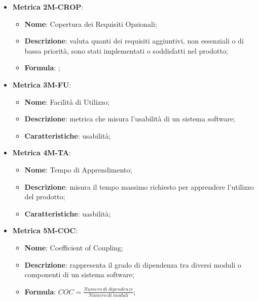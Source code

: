 \begin{itemize}
    \item \textbf{Metrica 2M-CROP}:
    \begin{itemize}
        \item \textbf{Nome}: Copertura dei Requisiti Opzionali;
        \item \textbf{Descrizione}: valuta quanti dei requisiti aggiuntivi, non essenziali o di bassa priorità, sono stati implementati o soddisfatti nel prodotto;
        \item \textbf{Formula}: ;
    \end{itemize}
\end{itemize}

\begin{itemize}
    \item \textbf{Metrica 3M-FU}:
    \begin{itemize}
        \item \textbf{Nome}: Facilità di Utilizzo;
        \item \textbf{Descrizione}: metrica che misura l'usabilità di un sistema software;
        \item \textbf{Caratteristiche}: usabilità;
    \end{itemize}
\end{itemize}

\begin{itemize}
    \item \textbf{Metrica 4M-TA}:
    \begin{itemize}
        \item \textbf{Nome}: Tempo di Apprendimento;
        \item \textbf{Descrizione}: misura il tempo massimo richiesto per apprendere l'utilizzo del prodotto;
        \item \textbf{Caratteristiche}: uasbilità;
    \end{itemize}
\end{itemize}

\begin{itemize}
    \item \textbf{Metrica 5M-COC}:
    \begin{itemize}
        \item \textbf{Nome}: Coefficient of Coupling;
        \item \textbf{Descrizione}: rappresenta il grado di dipendenza tra diversi moduli o componenti di un sistema software;
        \item \textbf{Formula}: $COC = \frac{Numero\: di\: dipendenze}{Numero\: di\: moduli}$;
    \end{itemize}
\end{itemize}

